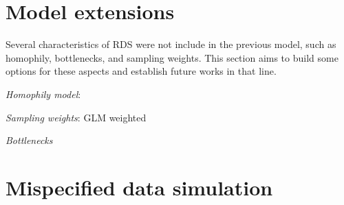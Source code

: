   



\section{Model extensions}

Several characteristics of RDS were not include in the previous model, such as
homophily, bottlenecks, and sampling weights. This section aims to build some
options for these aspects and establish future works in that line. 

\begin{alineas}
  \item {\em Homophily model}: \cite{yauck2021general} 
  \item {\em Sampling weights}: GLM weighted
  \item {\em Bottlenecks}
\end{alineas}

\section{Mispecified data simulation}

